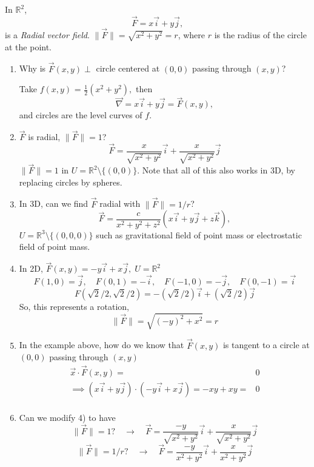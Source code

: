 \documentclass[12pt]{book}
\theoremstyle{definition}
\theoremstyle{remark}
\begin{document}
    \begin{example}In $\mathbb{R}^2$,
      $$\vec{{F}} = x \vec{{i}} + y \vec{{j}}, $$
      is a \textit{Radial vector field}. $\|\vec{{F}} \| = \sqrt{x^2 + y^2} = r$, where $r$ is the radius of the circle at the point.
\begin{enumerate}
  \item Why is $\vec{{F}} (x,y) \perp $ circle centered at $(0,0)$ passing through $(x,y)$? 

  Take $f(x,y)$ = $\frac{1}{2} (x^2 + y^2), $ then 
      $$\vec{{\nabla}}  = x \vec{{i}} + y \vec{{j}} = \vec{{F}} {(x,y)},$$
      and circles are the level curves of $f$. 
  \item $\vec{{F}}$ is radial, $\| \vec{{F}} \| = 1 $? 
  $$\vec{{F}} = \frac{x}{\sqrt{x^2 + y^2}} \vec{i} + \frac{x}{\sqrt{x^2 + y^2}} \vec{j}  $$
  $\| \vec{{F}}\| = 1$ in $U = \mathbb{R}^2 \setminus \{(0,0)\}.$ Note that all of this also works in 3D, by replacing circles by spheres. 
  \item In 3D, can we find $\vec{{F}}$ radial with $\| \vec{{F}} \| = 1/r$? 
  $$\vec{{F}} = \frac{c}{x^2 + y^2 + z^2} ( x \vec{{i}} + y \vec{{j}} + z \vec{{k}} ),  $$
  $U = \mathbb{R}^3 \setminus \{ (0,0,0) \}$ such as gravitational field of point mass or electrostatic field of point mass. 
  \item In 2D, $\vec{{F}} (x,y) = -y \vec{{i}} + x \vec{{j}}, \; U= \mathbb{R}^2$
  $$F(1,0) = \vec{{j}} ,\quad F(0,1) = -\vec{{i}} {}, \quad F(-1,0) = - \vec{{j}}, \quad F(0,-1) = \vec{i} $$
  $$F(\sqrt{2}/2, \sqrt{2}/2) = - (\sqrt{2}/2) \vec{{i}} + (\sqrt{2} / 2) \vec{{j}}  $$
  So, this represents a rotation, 
  $$\|\vec{{F}} \| = \sqrt{(-y)^2 + x^2}= r  $$
  \item In the example above, how do we know that $\vec{{F}} {(x,y)}$ is tangent to a circle at $(0,0)$ passing through $(x,y)$ 
  \begin{equation*}
    \begin{split}
      \vec{{x}} \cdot \vec{{F}} (x,y)=& 0 \\ 
      \implies (x \vec{{i}} + y \vec{{j}} ) \cdot (-y\vec{{i}} + x \vec{{j}} ) = -xy + xy =&0 \\
    \end{split}
  \end{equation*}
  \item Can we modify 4) to have 
  $$\| \vec{{F}} \| = 1? \quad \to \quad \vec{{F}} = \frac{-y}{\sqrt{x^2 + y^2}} \vec{{i}}  + \frac{x}{\sqrt{x^2 + y^2}}\vec{{j}}   $$
$$\| \vec{{F}} \| = 1/r? \quad \to \quad \vec{{F}} = \frac{-y}{{x^2 + y^2}} \vec{{i}}  + \frac{x}{{x^2 + y^2}}\vec{{j}}   $$

\end{enumerate}
\end{example}
\end{document}
